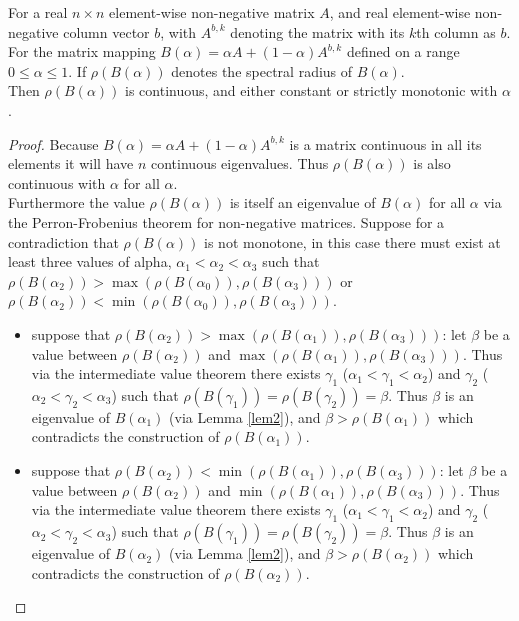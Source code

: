 \begin{Theorem}\label{th:2}
For a real $n\times n$ element-wise non-negative matrix $A$, and real element-wise non-negative column vector $b$, with $A^{b,k}$ denoting the matrix with its $k$th column as $b$.
For the matrix mapping $B(\alpha) = \alpha A + (1-\alpha)A^{b,k}$ defined on a range $0\le\alpha\le1$. If $\rho(B(\alpha))$ denotes the spectral radius of $B(\alpha)$.\\ Then $\rho(B(\alpha))$ is continuous, and either constant or strictly monotonic with $\alpha$.
\end{Theorem}
\begin{proof}
Because $B(\alpha) = \alpha A + (1-\alpha)A^{b,k}$ is a matrix continuous in all its elements it will have $n$ continuous eigenvalues.
Thus $\rho(B(\alpha))$ is also continuous with $\alpha$ for all $\alpha$.\\
Furthermore the value $\rho(B(\alpha))$ is itself an eigenvalue of $B(\alpha)$ for all $\alpha$ via the Perron-Frobenius theorem for non-negative matrices.
Suppose for a contradiction that $\rho(B(\alpha))$ is not monotone, in this case there must exist at least three values of alpha, $\alpha_1<\alpha_2<\alpha_3$ such that $\rho(B(\alpha_2))>\max(\rho(B(\alpha_0)),\rho(B(\alpha_3)))$ or $\rho(B(\alpha_2))<\min(\rho(B(\alpha_0)),\rho(B(\alpha_3)))$.
\begin{itemize}[leftmargin=*,labelsep=4mm]
\item	suppose that $\rho(B(\alpha_2))>\max(\rho(B(\alpha_1)),\rho(B(\alpha_3)))$: let $\beta$ be a value between $\rho(B(\alpha_2))$ and $\max(\rho(B(\alpha_1)),\rho(B(\alpha_3)))$. Thus via the intermediate value theorem there exists $\gamma_1$ ($\alpha_1<\gamma_1<\alpha_2$) and $\gamma_2$ ($\alpha_2<\gamma_2<\alpha_3$) such that $\rho(B(\gamma_1))=\rho(B(\gamma_2))=\beta$. Thus $\beta$ is an eigenvalue of $B(\alpha_1)$ (via Lemma \ref{lem2}), and $\beta > \rho(B(\alpha_1))$ which contradicts the construction of $\rho(B(\alpha_1))$.
\item   suppose that $\rho(B(\alpha_2))<\min(\rho(B(\alpha_1)),\rho(B(\alpha_3)))$: let $\beta$ be a value between $\rho(B(\alpha_2))$ and $\min(\rho(B(\alpha_1)),\rho(B(\alpha_3)))$. Thus via the intermediate value theorem there exists $\gamma_1$ ($\alpha_1<\gamma_1<\alpha_2$) and $\gamma_2$ ($\alpha_2<\gamma_2<\alpha_3$) such that $\rho(B(\gamma_1))=\rho(B(\gamma_2))=\beta$. Thus $\beta$ is an eigenvalue of $B(\alpha_2)$ (via Lemma \ref{lem2}), and $\beta > \rho(B(\alpha_2))$ which contradicts the construction of $\rho(B(\alpha_2))$.

\end{itemize}
\end{proof}
